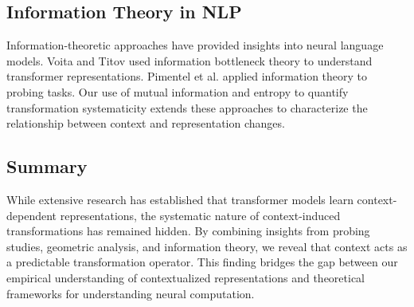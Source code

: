 \subsection{Information Theory in NLP}

Information-theoretic approaches have provided insights into neural language models. Voita and Titov \cite{voita2020information} used information bottleneck theory to understand transformer representations. Pimentel et al. \cite{pimentel2020information} applied information theory to probing tasks. Our use of mutual information and entropy to quantify transformation systematicity extends these approaches to characterize the relationship between context and representation changes.

\subsection{Summary}

While extensive research has established that transformer models learn context-dependent representations, the systematic nature of context-induced transformations has remained hidden. By combining insights from probing studies, geometric analysis, and information theory, we reveal that context acts as a predictable transformation operator. This finding bridges the gap between our empirical understanding of contextualized representations and theoretical frameworks for understanding neural computation.